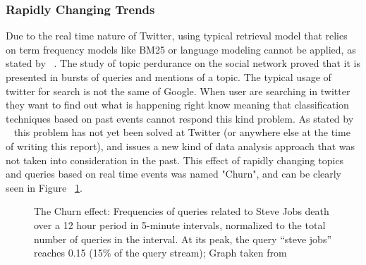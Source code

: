 \subsubsection{Rapidly Changing Trends} %
\label{ssub:real_time_}
Due to the real time nature of Twitter, using typical retrieval model that relies on term frequency models like BM25 or language modeling cannot be applied, as stated by ~\citet{Lin2012}. The study of topic perdurance on the social network proved that it is presented in bursts of queries and mentions of a topic. The typical usage of twitter for search is not the same of Google. When user are searching in twitter they want to find out what is happening right know meaning that classification techniques based on past events cannot respond this kind problem. As stated by ~\citet{Lin2012} this problem has not yet been solved at Twitter (or anywhere else at the time of writing this report), and issues a new kind of data analysis approach that was not taken into consideration in the past. 
This effect of rapidly changing topics and queries based on real time events was named "Churn", and can be clearly seen in Figure ~\ref{fig:churn}.

  \begin{figure}[tb]
    \begin{center}
    \noindent{}
    \end{center}
    \caption{The Churn effect: Frequencies of queries related to Steve Jobs death over a 12 hour period in 5-minute intervals, normalized to the total number of queries in the interval. At its peak, the query “steve jobs” reaches 0.15 (15\% of the query stream); Graph taken from ~\cite{Lin2012}}
    \label{fig:churn}
  \end{figure}

